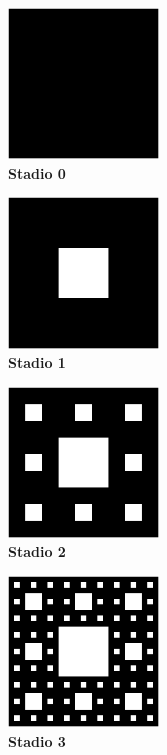 \vspace{5mm}
\begin{minipage}{4.1cm}
\begin{center}
 \includegraphics[width=4.0cm]{bildoj/carpet0.png}\\
\textbf{Stadio 0}
\end{center}
\end{minipage}
\begin{minipage}{4.1cm}
\begin{center}
 \includegraphics[width=4.0cm]{bildoj/carpet1.png}\\
\textbf{Stadio 1}
\end{center}
\end{minipage}
\begin{minipage}{4.1cm}
\begin{center}
 \includegraphics[width=4.0cm]{bildoj/carpet2.png}\\
\textbf{Stadio 2}
\end{center}
\end{minipage}
\begin{minipage}{4.1cm}
\begin{center}
 \includegraphics[width=4.0cm]{bildoj/carpet3.png}\\
\textbf{Stadio 3}
\end{center}
\end{minipage}
\vspace{5mm}

